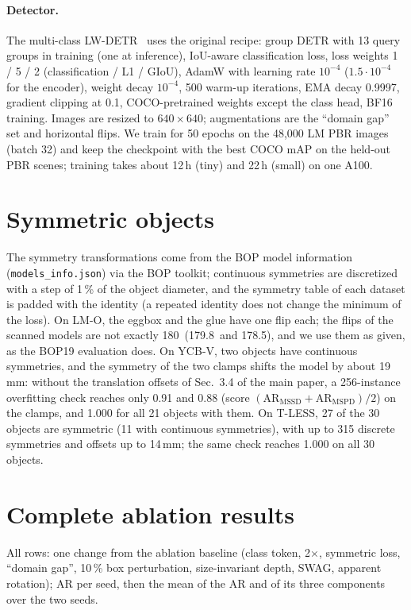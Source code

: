 \paragraph{Detector.}
The multi-class LW-DETR~\cite{chen2024lwdetr} uses the original recipe: group DETR with 13 query
groups in training (one at inference), IoU-aware classification loss, loss weights 1 / 5 / 2
(classification / L1 / GIoU), AdamW with learning rate $10^{-4}$ ($1.5 \cdot 10^{-4}$ for the
encoder), weight decay $10^{-4}$, 500 warm-up iterations, EMA decay 0.9997, gradient clipping at
0.1, COCO-pretrained weights except the class head, BF16 training. Images are resized to
$640 \times 640$; augmentations are the ``domain gap'' set and horizontal flips. We train for 50
epochs on the 48,000 LM PBR images (batch 32) and keep the checkpoint with the best COCO mAP on
the held-out PBR scenes; training takes about 12\,h (tiny) and 22\,h (small) on one A100.

\section{Symmetric objects}
\label{sec:supp:sym}
The symmetry transformations come from the BOP model information (\texttt{models\_info.json}) via
the BOP toolkit; continuous symmetries are discretized with a step of 1\,\% of the object diameter,
and the symmetry table of each dataset is padded with the identity (a repeated identity does not
change the minimum of the loss). On LM-O, the eggbox and the glue have one flip each; the flips of
the scanned models are not exactly 180\textdegree\ (179.8\textdegree\ and 178.5\textdegree), and we
use them as given, as the BOP19 evaluation does. On YCB-V, two objects have continuous symmetries,
and the symmetry of the two clamps shifts the model by about 19\,mm: without the translation
offsets of Sec.~3.4 of the main paper, a 256-instance overfitting check reaches
only 0.91 and 0.88 (score $(\mathrm{AR}_\mathrm{MSSD} + \mathrm{AR}_\mathrm{MSPD})/2$) on the
clamps, and 1.000 for all 21 objects with them. On T-LESS, 27 of the 30 objects are symmetric (11
with continuous symmetries), with up to 315 discrete symmetries and offsets up to 14\,mm; the same
check reaches 1.000 on all 30 objects.

\section{Complete ablation results}
\label{sec:supp:ablations}
All rows: one change from the ablation baseline (class token, 2$\times$, symmetric loss,
``domain gap'', 10\,\% box perturbation, size-invariant depth, SWAG, apparent rotation); AR per
seed, then the mean of the AR and of its three components over the two seeds.

